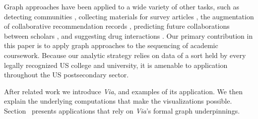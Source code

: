 Graph approaches have been applied to a wide variety of other tasks, such as detecting communities \cite{Fortunato2004}, collecting materials for survey articles \cite{ji2015}, the augmentation of collaborative recommendation records \cite{huang2005}, predicting future collaborations between scholars \cite{liben2007}, and suggesting drug interactions \cite{zitnik2018}. Our primary contribution in this paper is to apply graph approaches to the sequencing of academic coursework. Because our analytic strategy relies on data of a sort held by every legally recognized US college and university, it is amenable to application throughout the US postsecondary sector. 





After related work we introduce {\em Via}, and examples of its
application. We then explain the underlying computations that make the
visualizations possible. Section~ presents
applications that rely on {\em Via}'s formal graph underpinnings.



